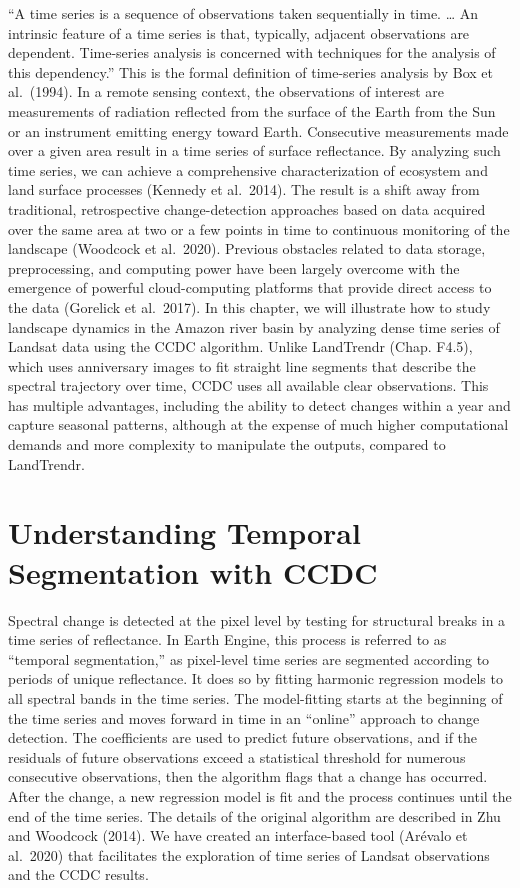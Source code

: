 \documentclass[
  letterpaper,
  DIV=11,
  numbers=noendperiod]{scrreprt}
\begin{document}
``A time series is a sequence of observations taken sequentially in
time. \ldots{} An intrinsic feature of a time series is that, typically,
adjacent observations are dependent. Time-series analysis is concerned
with techniques for the analysis of this dependency.'' This is the
formal definition of time-series analysis by Box et al.~(1994). In a
remote sensing context, the observations of interest are measurements of
radiation reflected from the surface of the Earth from the Sun or an
instrument emitting energy toward Earth. Consecutive measurements made
over a given area result in a time series of surface reflectance. By
analyzing such time series, we can achieve a comprehensive
characterization of ecosystem and land surface processes (Kennedy et
al.~2014). The result is a shift away from traditional, retrospective
change-detection approaches based on data acquired over the same area at
two or a few points in time to continuous monitoring of the landscape
(Woodcock et al.~2020). Previous obstacles related to data storage,
preprocessing, and computing power have been largely overcome with the
emergence of powerful cloud-computing platforms that provide direct
access to the data (Gorelick et al.~2017). In this chapter, we will
illustrate how to study landscape dynamics in the Amazon river basin by
analyzing dense time series of Landsat data using the CCDC algorithm.
Unlike LandTrendr (Chap. F4.5), which uses anniversary images to fit
straight line segments that describe the spectral trajectory over time,
CCDC uses all available clear observations. This has multiple
advantages, including the ability to detect changes within a year and
capture seasonal patterns, although at the expense of much higher
computational demands and more complexity to manipulate the outputs,
compared to LandTrendr.

\hypertarget{understanding-temporal-segmentation-with-ccdc}{%
\section{Understanding Temporal Segmentation with
CCDC}\label{understanding-temporal-segmentation-with-ccdc}}

Spectral change is detected at the pixel level by testing for structural
breaks in a time series of reflectance. In Earth Engine, this process is
referred to as ``temporal segmentation,'' as pixel-level time series are
segmented according to periods of unique reflectance. It does so by
fitting harmonic regression models to all spectral bands in the time
series. The model-fitting starts at the beginning of the time series and
moves forward in time in an ``online'' approach to change detection. The
coefficients are used to predict future observations, and if the
residuals of future observations exceed a statistical threshold for
numerous consecutive observations, then the algorithm flags that a
change has occurred. After the change, a new regression model is fit and
the process continues until the end of the time series. The details of
the original algorithm are described in Zhu and Woodcock (2014). We have
created an interface-based tool (Arévalo et al.~2020) that facilitates
the exploration of time series of Landsat observations and the CCDC
results.
\end{document}
